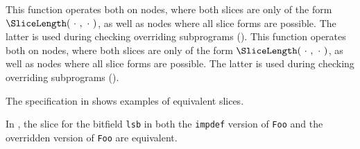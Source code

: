 This function operates both on \typedast{} nodes, where both slices are only
of the form $\SliceLength(\ \cdot\ ,\ \cdot\ )$, as well as \untypedast{} nodes where all slice forms
are possible. The latter is used during checking overriding subprograms ().
This function operates both on \typedast{} nodes, where both slices are only
of the form $\SliceLength(\ \cdot\ ,\ \cdot\ )$, as well as \untypedast{} nodes where all slice forms
are possible. The latter is used during checking overriding subprograms ().

The specification in  shows examples of equivalent slices.

In , the slice for the bitfield \verb|lsb| in both the \texttt{impdef} version
of \verb|Foo| and the overridden version of \verb|Foo| are equivalent.


